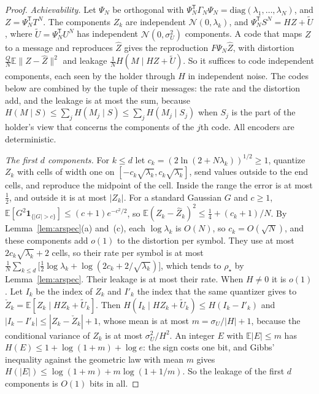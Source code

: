 \documentclass[11pt,onecolumn]{IEEEtran}
\newcommand{\E}{\mathbb{E}}
\begin{document}
\begin{proof}
\emph{Achievability.} Let $\Psi_N$ be orthogonal with
$\Psi_N^{\mathsf T}\Gamma_N\Psi_N=\mathrm{diag}(\lambda_1,\dots,\lambda_N)$,
and $Z=\Psi_N^{\mathsf T}T^N$. The components $Z_k$ are independent
$\mathcal N(0,\lambda_k)$, and $\Psi_N^{\mathsf T}S^N=HZ+\tilde U$, where
$\tilde U=\Psi_N^{\mathsf T}U^N$ has independent $\mathcal N(0,\sigma_U^2)$
components. A code that maps $Z$ to a message and reproduces $\hat Z$
gives the reproduction $F\Psi_N\hat Z$, with distortion
$\tfrac QN\E\|Z-\hat Z\|^2$ and leakage
$\tfrac1NH(M\mid HZ+\tilde U)$. So it suffices to code independent
components, each seen by the holder through $H$ in independent noise.
The codes below are combined by the tuple of their messages: the rate
and the distortion add, and the leakage is at most the sum, because
$H(M\mid S)\le\sum_jH(M_j\mid S)\le\sum_jH(M_j\mid S_j)$ when $S_j$ is
the part of the holder's view that concerns the components of the
$j$th code. All encoders are deterministic.

\emph{The first $d$ components.} For $k\le d$ let
$c_k=(2\ln(2+N\lambda_k))^{1/2}\ge1$, quantize $Z_k$ with cells of width
one on $[-c_k\sqrt{\lambda_k},c_k\sqrt{\lambda_k}]$, send values outside
to the end cells, and reproduce the midpoint of the cell. Inside the
range the error is at most $\tfrac12$, and outside it is at most $|Z_k|$.
For a standard Gaussian $G$ and $c\ge1$,
$\E[G^2\mathbf 1_{\{|G|>c\}}]\le(c+1)e^{-c^2/2}$, so
$\E(Z_k-\hat Z_k)^2\le\tfrac14+(c_k+1)/N$. By
Lemma~\ref{lem:arspec}(a) and~(c), each $\log\lambda_k$ is $O(N)$, so
$c_k=O(\sqrt N)$, and these components add $o(1)$ to the distortion per
symbol. They use at most $2c_k\sqrt{\lambda_k}+2$ cells, so their rate
per symbol is at most
$\tfrac1N\sum_{k\le d}\bigl[\tfrac12\log\lambda_k+\log(2c_k+2/\sqrt{\lambda_k})\bigr]$,
which tends to $\rho_\star$ by Lemma~\ref{lem:arspec}. Their leakage is
at most their rate. When $H\ne0$ it is $o(1)$. Let $I_k$ be the index
of $Z_k$ and $I'_k$ the index that the same quantizer gives to
$\check Z_k=\E[Z_k\mid HZ_k+\tilde U_k]$. Then
$H(I_k\mid HZ_k+\tilde U_k)\le H(I_k-I'_k)$ and
$|I_k-I'_k|\le|Z_k-\check Z_k|+1$, whose mean is at most
$m=\sigma_U/|H|+1$, because the conditional variance of $Z_k$ is at most
$\sigma_U^2/H^2$. An integer $E$ with $\E|E|\le m$ has
$H(E)\le1+\log(1+m)+\log e$: the sign costs one bit, and Gibbs'
inequality against the geometric law with mean $m$ gives
$H(|E|)\le\log(1+m)+m\log(1+1/m)$. So the leakage of the first $d$
components is $O(1)$ bits in all.


\end{proof}
\end{document}
